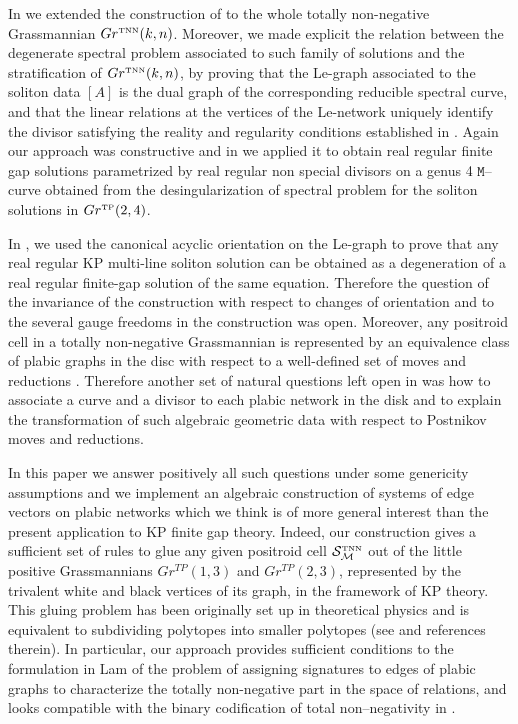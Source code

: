 \documentclass[11pt]{amsart}
\theoremstyle{plain}
\numberwithin{equation}{section}
\def \GTNN {{Gr^{\mbox{\tiny TNN}} (k,n)}}
\def \S {{\mathcal S}_{\mathcal M}^{\mbox{\tiny TNN}}}
\begin{document}
In \cite{AG3} we extended the construction of \cite{AG1} to the whole totally non-negative Grassmannian $\GTNN$. Moreover, we made explicit the relation between the degenerate spectral problem associated to such family of solutions and the stratification of $\GTNN$, by proving that the Le-graph associated to the soliton data $[A]$ is the dual graph of the corresponding reducible spectral curve, and that the linear relations at the vertices of the Le-network uniquely identify the divisor satisfying the reality and regularity conditions established in \cite{DN}. Again our approach was constructive and in \cite{AG2} we applied it to obtain real regular finite gap solutions parametrized by real regular non special divisors on a genus 4 $\mathtt M$--curve obtained from the desingularization of spectral problem for the soliton solutions in $Gr^{\mbox{\tiny TP}}(2,4)$.
	
In \cite{AG3}, we used the canonical acyclic orientation on the Le-graph to prove
that any real regular KP multi-line soliton solution can be obtained as a degeneration of a real regular finite-gap solution of the same equation. Therefore the question of the invariance of the construction with respect to changes of orientation and to the several gauge freedoms in the construction was open. Moreover, any positroid cell in a totally non-negative Grassmannian is represented by an equivalence class of plabic graphs in the disc with respect to a well-defined set of moves and reductions \cite{Pos}. Therefore another set of natural questions left open in \cite{AG3} was how to associate a curve and a divisor to each plabic network in the disk and to explain the transformation of such algebraic geometric data with respect to Postnikov moves and reductions. 

In this paper we answer positively all such questions under some genericity assumptions and we implement an algebraic construction of systems of edge vectors on plabic networks which we think is of more general interest than the present application to KP finite gap theory. Indeed, our construction gives a sufficient set of rules to glue any given positroid cell $\S$ out of the little positive Grassmannians $Gr^{TP}(1,3)$ and $Gr^{TP}(2,3)$, represented by the trivalent white and black vertices of its graph, in the framework of KP theory. This gluing problem has been originally set up in theoretical physics \cite{AGP1,AGP2} and 
is equivalent to subdividing polytopes into smaller polytopes (see \cite{Pos2} and references therein). In particular,
our approach provides sufficient conditions to the formulation in Lam \cite{Lam2} of the problem of assigning signatures to edges of plabic graphs to characterize the totally non-negative part in the space of relations, and looks compatible with the binary codification of total non--negativity in \cite{ATT}.
\end{document}
